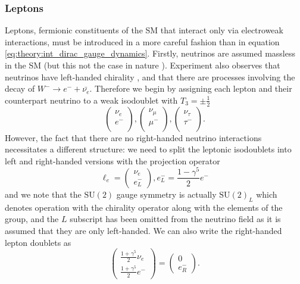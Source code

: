\subsubsection{Leptons}
Leptons, fermionic constituents of the SM that interact only via electroweak interactions, must be introduced in a more careful fashion than in equation \ref{eq:theory:int_dirac_gauge_dynamics}. 
Firstly, neutrinos are assumed massless in the SM (but this not the case in nature \cite{NeutrinoOscillation}).
Experiment also observes that neutrinos have left-handed chirality \cite{NeutrinoChirality}, and that there are processes involving the decay of $W^{-}\rightarrow{}e^{-}+\bar{\nu_{e}}$. 
Therefore we begin by assigning each lepton and their counterpart neutrino to a weak isodoublet with $T_{3} = \pm\frac{1}{2}$ 
\begin{equation}
    \label{eq:theory:lepton_isodoublets}
    \begin{pmatrix}
        \nu_{e} \\
        e^{-} \\
    \end{pmatrix},
    \begin{pmatrix}
        \nu_{\mu} \\
        \mu^{-} \\
    \end{pmatrix},
    \begin{pmatrix}
        \nu_{\tau} \\
        \tau^{-} \\
    \end{pmatrix}.
\end{equation}
However, the fact that there are no right-handed neutrino interactions necessitates a different structure: we need to split the leptonic isodoublets into left and right-handed versions with the projection operator
\begin{equation}
    \ell_{e} =\begin{pmatrix}
        \nu_{e} \\
        e_{L}^{-}
    \end{pmatrix},
    e^{-}_{L} = \frac{1-\gamma^{5}}{2}e^{-}
\end{equation}
and we note that the $\mathrm{SU}(2)$ gauge symmetry is actually $\mathrm{SU}(2)_{L}$ which denotes operation with the chirality operator along with the elements of the group, and the $L$ subscript has been omitted from the neutrino field as it is assumed that they are only left-handed. 
We can also write the right-handed lepton doublets as
\begin{equation}
    \label{eq:theory:right_handed_leptons}
    \begin{pmatrix}
        \frac{1+\gamma^{5}}{2}\nu_{e} \\
        \frac{1+\gamma^{5}}{2}e^{-}
    \end{pmatrix}=\begin{pmatrix}
        0 \\
        e_{R}^{-}
    \end{pmatrix}.
\end{equation}
